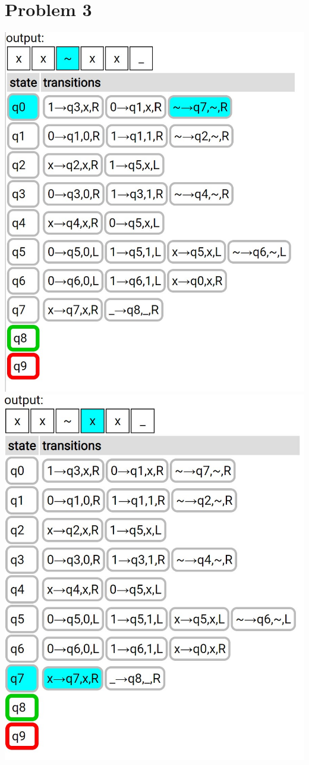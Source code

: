 \documentclass{article}
\newenvironment{problem}[1]{
  \nobreak\section*{Problem #1}
}{}
\begin{document}
\begin{problem}{3}
\begin{center}
      \includegraphics[scale=0.5]{images/14.jpg}
      \includegraphics[scale=0.5]{images/15.jpg}

\end{center}
\end{problem}
\end{document}

